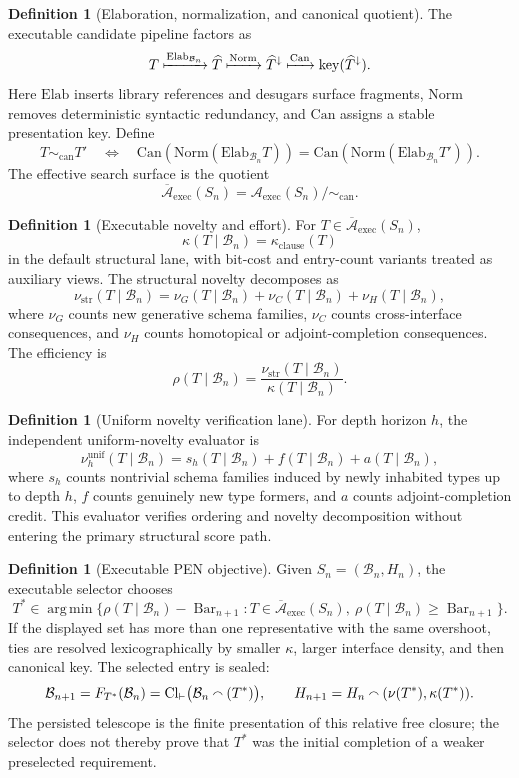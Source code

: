 \documentclass[11pt]{article}
\theoremstyle{plain}
\theoremstyle{definition}
\newtheorem{definition}[theorem]{Definition}
\theoremstyle{remark}
\newcommand{\B}{\mathcal{B}}
\newcommand{\A}{\mathcal{A}}
\newcommand{\SelBar}{\operatorname{Bar}}
\newcommand{\argmin}{\operatorname*{arg\,min}}
\begin{document}
\begin{definition}[Elaboration, normalization, and canonical quotient]
The executable candidate pipeline factors as
\[
T
\xmapsto{\mathrm{Elab}_{\B_n}}
\widehat T
\xmapsto{\mathrm{Norm}}
\widehat T^\downarrow
\xmapsto{\mathrm{Can}}
\mathrm{key}(\widehat T^\downarrow).
\]
Here \(\mathrm{Elab}\) inserts library references and desugars surface fragments, \(\mathrm{Norm}\) removes deterministic syntactic redundancy, and \(\mathrm{Can}\) assigns a stable presentation key. Define
\[
T\sim_{\mathrm{can}}T'
\quad\Longleftrightarrow\quad
\mathrm{Can}(\mathrm{Norm}(\mathrm{Elab}_{\B_n}T))
=
\mathrm{Can}(\mathrm{Norm}(\mathrm{Elab}_{\B_n}T')).
\]
The effective search surface is the quotient
\[
\overline{\A}_{\mathrm{exec}}(S_n)
=
\A_{\mathrm{exec}}(S_n)/{\sim_{\mathrm{can}}}.
\]
\end{definition}

\begin{definition}[Executable novelty and effort]
For \(T\in\overline{\A}_{\mathrm{exec}}(S_n)\),
\[
\kappa(T\mid\B_n)
=
\kappa_{\mathrm{clause}}(T)
\]
in the default structural lane, with bit-cost and entry-count variants treated as auxiliary views. The structural novelty decomposes as
\[
\nu_{\mathrm{str}}(T\mid\B_n)
=
\nu_G(T\mid\B_n)+\nu_C(T\mid\B_n)+\nu_H(T\mid\B_n),
\]
where \(\nu_G\) counts new generative schema families, \(\nu_C\) counts cross-interface consequences, and \(\nu_H\) counts homotopical or adjoint-completion consequences. The efficiency is
\[
\rho(T\mid\B_n)=
\frac{\nu_{\mathrm{str}}(T\mid\B_n)}{\kappa(T\mid\B_n)}.
\]
\end{definition}

\begin{definition}[Uniform novelty verification lane]
For depth horizon \(h\), the independent uniform-novelty evaluator is
\[
\nu^{\mathrm{unif}}_h(T\mid\B_n)
=
s_h(T\mid\B_n)+f(T\mid\B_n)+a(T\mid\B_n),
\]
where \(s_h\) counts nontrivial schema families induced by newly inhabited types up to depth \(h\), \(f\) counts genuinely new type formers, and \(a\) counts adjoint-completion credit. This evaluator verifies ordering and novelty decomposition without entering the primary structural score path.
\end{definition}

\begin{definition}[Executable PEN objective]
Given \(S_n=(\B_n,H_n)\), the executable selector chooses
\[
T^*\in
\argmin
\{\rho(T\mid\B_n)-\SelBar_{n+1}:
T\in\overline{\A}_{\mathrm{exec}}(S_n),\
\rho(T\mid\B_n)\ge\SelBar_{n+1}\}.
\]
If the displayed set has more than one representative with the same overshoot, ties are resolved lexicographically by smaller \(\kappa\), larger interface density, and then canonical key. The selected entry is sealed:
\[
\B_{n+1}=F_{T^*}(\B_n)
=\mathrm{Cl}_{\vdash}
\bigl(\B_n\mathbin{\raisebox{0.1ex}{\(\smallfrown\)}}(T^*)\bigr),
\qquad
H_{n+1}=H_n\mathbin{\raisebox{0.1ex}{\(\smallfrown\)}}(\nu(T^*),\kappa(T^*)).
\]
The persisted telescope is the finite presentation of this relative free closure; the selector does not thereby prove that \(T^*\) was the initial completion of a weaker preselected requirement.
\end{definition}
\end{document}

